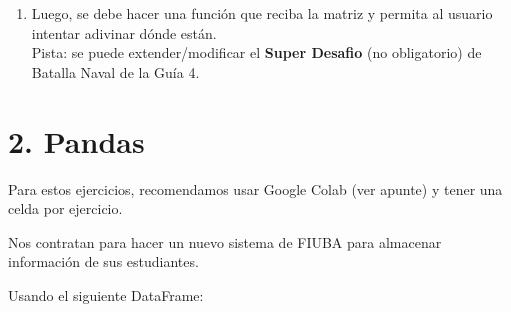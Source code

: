 \documentclass[
  letterpaper,
  DIV=11,
  numbers=noendperiod]{scrreprt}
\providecommand{\tightlist}{%
  \setlength{\itemsep}{0pt}\setlength{\parskip}{0pt}}\usepackage{longtable,booktabs,array}
\begin{document}
\begin{enumerate}
  \begin{enumerate}
  \def\labelenumii{\alph{enumii}.}
  \setcounter{enumii}{1}
  \tightlist
  \item
    Luego, se debe hacer una función que reciba la matriz y permita al
    usuario intentar adivinar dónde están.\\
    Pista: se puede extender/modificar el \textbf{Super Desafio} (no
    obligatorio) de Batalla Naval de la Guía 4.
  \end{enumerate}
\end{enumerate}

\section*{2. Pandas}\label{pandas-1}


\begin{tcolorbox}[enhanced jigsaw, arc=.35mm, toptitle=1mm, colframe=quarto-callout-note-color-frame, bottomtitle=1mm, opacitybacktitle=0.6, colbacktitle=quarto-callout-note-color!10!white, leftrule=.75mm, coltitle=black, toprule=.15mm, titlerule=0mm, title=\textcolor{quarto-callout-note-color}{\faInfo}\hspace{0.5em}{Note}, bottomrule=.15mm, rightrule=.15mm, colback=white, breakable, opacityback=0, left=2mm]

Para estos ejercicios, recomendamos usar Google Colab (ver apunte) y
tener una celda por ejercicio.

\end{tcolorbox}

Nos contratan para hacer un nuevo sistema de FIUBA para almacenar
información de sus estudiantes.

Usando el siguiente DataFrame:
\end{document}
